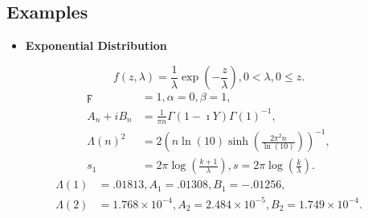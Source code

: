 \documentclass[titlepage,fleqn]{article}%
\begin{document}
\subsection{Examples}

\begin{itemize}
\item \textbf{Exponential Distribution}
\end{itemize}

%

\[
f(z,\lambda)=\frac{1}{\lambda}\exp\left(  -\frac{z}{\lambda}\right)
,0<\lambda,0\leq z.
\]%
\begin{align*}
\digamma &  =1,\alpha=0,\beta=1,\\
A_{n}+iB_{n}  &  =\frac{1}{\pi n}\Gamma\left(  1-\imath Y\right)
\Gamma\left(  1\right)  ^{-1},\\
\Lambda(n)^{2}  &  =2\left(  n\ln(10)\sinh\left(  \frac{2\pi^{2}n}{\ln
(10)}\right)  \right)  ^{-1},\\
s_{1}  &  =2\pi\log\left(  \frac{k+1}{\lambda}\right)  ,s=2\pi\log\left(
\frac{k}{\lambda}\right)  .
\end{align*}%
\begin{align*}
\Lambda(1)  &  =.01813,A_{1}=.01308,B_{1}=-.01256,\\
\Lambda(2)  &  =1.768\times10^{-4},A_{2}=2.484\times10^{-5},B_{2}%
=1.749\times10^{-4}.
\end{align*}
\end{document}
